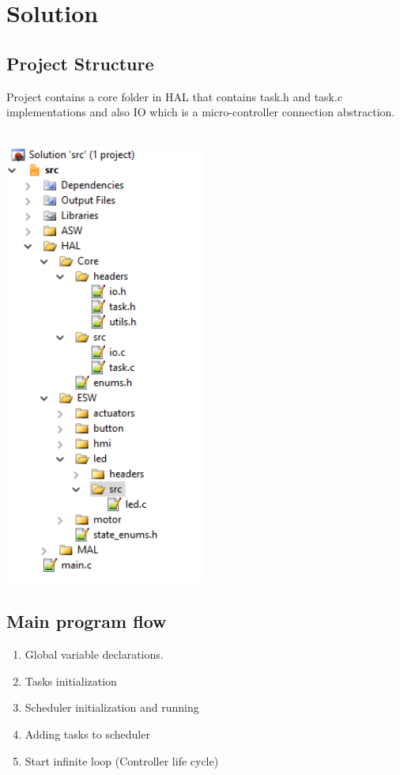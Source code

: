 \section{Solution}

\subsection{Project Structure}
Project contains a core folder in HAL that contains task.h and task.c implementations and also IO which is a micro-controller connection abstraction.
\\\\
\centerline{
	\includegraphics[width=0.5\textwidth]{solution/images/src.png}
}


\subsection{Main program flow}
\begin{enumerate}
	\item Global variable declarations.
	\item Tasks initialization
    \item Scheduler initialization and running
    \item Adding tasks to scheduler
	\item Start infinite loop (Controller life cycle)
\end{enumerate}

